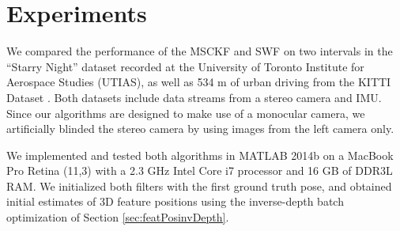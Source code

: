\documentclass[letterpaper, 10 pt, conference]{ieeeconf}  %
\begin{document}
\section{Experiments} \label{sec:experiments}
We compared the performance of the MSCKF and SWF on two intervals in the ``Starry Night'' dataset recorded at the University of Toronto Institute for Aerospace Studies (UTIAS), as well as 534 m of urban driving from the KITTI Dataset \cite{Geiger:2013:IJRR}.
Both datasets include data streams from a stereo camera and IMU.
Since our algorithms are designed to make use of a monocular camera, we artificially blinded the stereo camera by using images from the left camera only.

We implemented and tested both algorithms in MATLAB 2014b on a MacBook Pro Retina (11,3) with a 2.3 GHz Intel Core i7 processor and 16 GB of DDR3L RAM.
We initialized both filters with the first ground truth pose, and obtained initial estimates of 3D feature positions using the inverse-depth batch optimization of Section \ref{sec:featPosinvDepth}.

\end{document}
